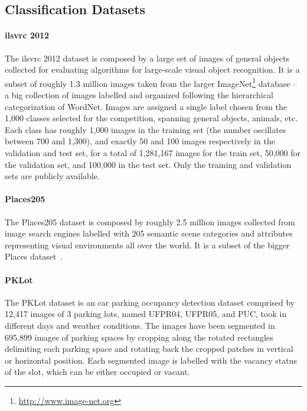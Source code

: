 \subsection{Classification Datasets}

\paragraph{\acrfull{ilsvrc} 2012~~\cite{russakovsky2015imagenet}}
The \acrfull{ilsvrc} 2012 dataset is composed by a large set of images of general objects collected for evaluating algorithms for large-scale visual object recognition.
It is a subset of roughly 1.3 million images taken from the larger ImageNet\footnote{\url{http://www.image-net.org}} database -- a big collection of images labelled and organized following the hierarchical categorization of WordNet.
Images are assigned a single label chosen from the 1,000 classes selected for the competition, spanning general objects, animals, etc.
Each class has roughly 1,000 images in the training set (the number oscillates between 700 and 1,300), and exactly 50 and 100 images respectively in the validation and test set, for a total of 1,281,167 images for the train set, 50,000 for the validation set, and 100,000 in the test set.
Only the training and validation sets are publicly available.

\paragraph{Places205~\cite{zhou2014learning}}
The Places205 dataset is composed by roughly 2.5 million images collected from image search engines labelled with 205 semantic scene categories and attributes representing visual environments all over the world.
It is a subset of the bigger Places dataset~\cite{zhou2016places}.

\paragraph{PKLot~\cite{de2015pklot}}
The PKLot dataset is an car parking occupancy detection dataset comprised by 12,417 images of 3 parking lots, named UFPR04, UFPR05, and PUC, took in different days and weather conditions.
The images have been segmented in 695,899 images of parking spaces by cropping along the rotated rectangles delimiting each parking space and rotating back the cropped patches in vertical or horizontal position.
Each segmented image is labelled with the vacancy status of the slot, which can be either occupied or vacant.

